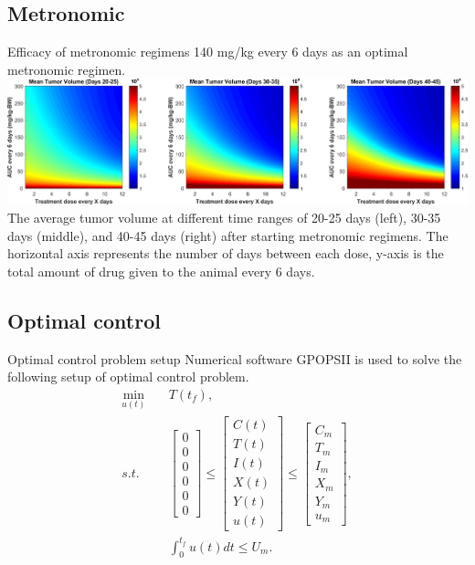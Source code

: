 \documentclass[10pt]{beamer}
\begin{document}
\subsection{Metronomic}
\begin{frame}{Efficacy of metronomic regimens}
	140 mg/kg every 6 days as an optimal metronomic regimen. \\ \vspace{0.5cm}
	\includegraphics[width=1\linewidth]{chemo-metronomic.png} \\
	\vspace{0.5cm}
	The average tumor volume at different time ranges of 20-25 days (left), 30-35 days (middle), and 40-45 days (right) after starting metronomic regimens. The horizontal axis represents the number of days between each dose, y-axis is the total amount of drug given to the animal every 6 days.
\end{frame}

\subsection{Optimal control}
\begin{frame}{Optimal control problem setup}
	Numerical software GPOPS\textunderscore II is used to solve the following setup of optimal control problem.\\
	\begin{subequations}
	\begin{align}  \label{eq:ocp}
			\min_{u(t)} & \quad T(t_f), \\
			s.t. & \quad 
			\begin{bmatrix}
				0 \\ 0 \\ 0 \\ 0 \\ 0 \\ 0
			\end{bmatrix} 
			\leq
			\begin{bmatrix}
				C(t) \\ T(t) \\ I(t) \\ X(t) \\ Y(t) \\ u(t)
			\end{bmatrix}
			\leq
			\begin{bmatrix}
				C_m \\ T_m \\ I_m \\ X_m \\ Y_m \\ u_m
			\end{bmatrix},
			\\
			& \quad \int_0^{t_f} u(t) dt \leq U_m.
	\end{align}
	\end{subequations}
\end{frame}
\end{document}
